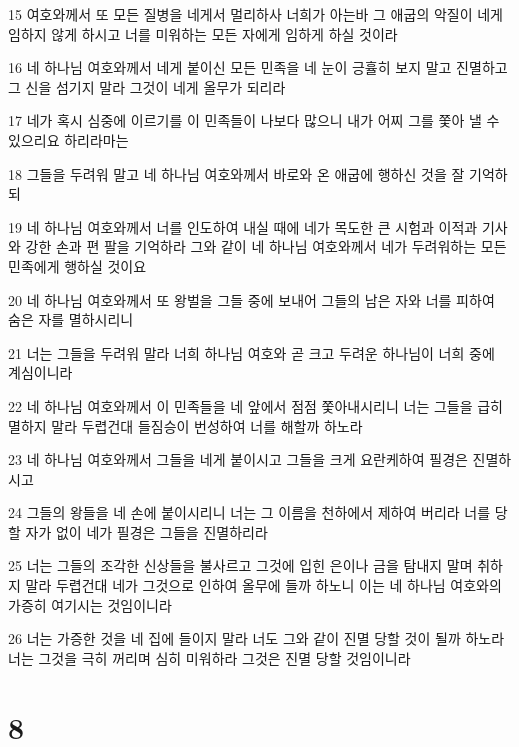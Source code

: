 \par 15 여호와께서 또 모든 질병을 네게서 멀리하사 너희가 아는바 그 애굽의 악질이 네게 임하지 않게 하시고 너를 미워하는 모든 자에게 임하게 하실 것이라
\par 16 네 하나님 여호와께서 네게 붙이신 모든 민족을 네 눈이 긍휼히 보지 말고 진멸하고 그 신을 섬기지 말라 그것이 네게 올무가 되리라
\par 17 네가 혹시 심중에 이르기를 이 민족들이 나보다 많으니 내가 어찌 그를 쫓아 낼 수 있으리요 하리라마는
\par 18 그들을 두려워 말고 네 하나님 여호와께서 바로와 온 애굽에 행하신 것을 잘 기억하되
\par 19 네 하나님 여호와께서 너를 인도하여 내실 때에 네가 목도한 큰 시험과 이적과 기사와 강한 손과 편 팔을 기억하라 그와 같이 네 하나님 여호와께서 네가 두려워하는 모든 민족에게 행하실 것이요
\par 20 네 하나님 여호와께서 또 왕벌을 그들 중에 보내어 그들의 남은 자와 너를 피하여 숨은 자를 멸하시리니
\par 21 너는 그들을 두려워 말라 너희 하나님 여호와 곧 크고 두려운 하나님이 너희 중에 계심이니라
\par 22 네 하나님 여호와께서 이 민족들을 네 앞에서 점점 쫓아내시리니 너는 그들을 급히 멸하지 말라 두렵건대 들짐승이 번성하여 너를 해할까 하노라
\par 23 네 하나님 여호와께서 그들을 네게 붙이시고 그들을 크게 요란케하여 필경은 진멸하시고
\par 24 그들의 왕들을 네 손에 붙이시리니 너는 그 이름을 천하에서 제하여 버리라 너를 당할 자가 없이 네가 필경은 그들을 진멸하리라
\par 25 너는 그들의 조각한 신상들을 불사르고 그것에 입힌 은이나 금을 탐내지 말며 취하지 말라 두렵건대 네가 그것으로 인하여 올무에 들까 하노니 이는 네 하나님 여호와의 가증히 여기시는 것임이니라
\par 26 너는 가증한 것을 네 집에 들이지 말라 너도 그와 같이 진멸 당할 것이 될까 하노라 너는 그것을 극히 꺼리며 심히 미워하라 그것은 진멸 당할 것임이니라

\chapter{8}

